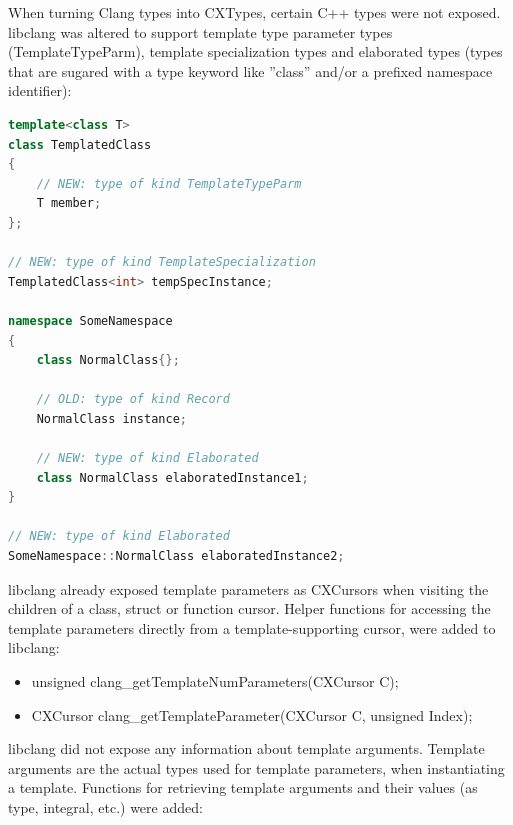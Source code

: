 When turning Clang types into CXTypes, certain C++ types were not exposed. libclang was altered to support template type parameter types (TemplateTypeParm), template specialization types and elaborated types (types that are sugared with a type keyword like ''class'' and/or a prefixed namespace identifier):

\SingleSpacing
\begin{lstlisting}[language=C++, caption=Examples of types now supported by libclang]
template<class T>
class TemplatedClass
{
	// NEW: type of kind TemplateTypeParm
	T member; 
};

// NEW: type of kind TemplateSpecialization
TemplatedClass<int> tempSpecInstance; 

namespace SomeNamespace
{	
	class NormalClass{};
	
	// OLD: type of kind Record
	NormalClass instance;
	
	// NEW: type of kind Elaborated
	class NormalClass elaboratedInstance1;
}

// NEW: type of kind Elaborated
SomeNamespace::NormalClass elaboratedInstance2; 
\end{lstlisting}
\OnehalfSpacing

libclang already exposed template parameters as CXCursors when visiting the children of a class, struct or function cursor. Helper functions for accessing the template parameters directly from a template-supporting cursor, were added to libclang:

\begin{itemize}\addtolength{\itemsep}{-0.5\baselineskip}
\item unsigned clang\_getTemplateNumParameters(CXCursor C);
\item CXCursor clang\_getTemplateParameter(CXCursor C, unsigned Index);
\end{itemize}

libclang did not expose any information about template arguments. Template arguments are the actual types used for template parameters, when instantiating a template. Functions for retrieving template arguments and their values (as type, integral, etc.) were added:

